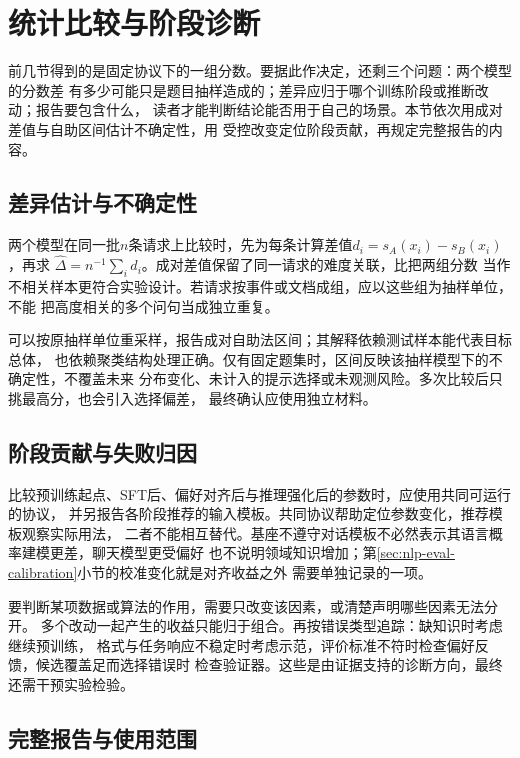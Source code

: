 \section{统计比较与阶段诊断}
\label{sec:nlp-eval-analysis}

前几节得到的是固定协议下的一组分数。要据此作决定，还剩三个问题：两个模型的分数差
有多少可能只是题目抽样造成的；差异应归于哪个训练阶段或推断改动；报告要包含什么，
读者才能判断结论能否用于自己的场景。本节依次用成对差值与自助区间估计不确定性，用
受控改变定位阶段贡献，再规定完整报告的内容。

\subsection{差异估计与不确定性}
\label{sec:nlp-eval-uncertainty}

两个模型在同一批$n$条请求上比较时，先为每条计算差值$d_i=s_A(x_i)-s_B(x_i)$，再求
$\widehat\Delta=n^{-1}\sum_i d_i$。成对差值保留了同一请求的难度关联，比把两组分数
当作不相关样本更符合实验设计。若请求按事件或文档成组，应以这些组为抽样单位，不能
把高度相关的多个问句当成独立重复。

可以按原抽样单位重采样，报告成对自助法区间；其解释依赖测试样本能代表目标总体，
也依赖聚类结构处理正确。仅有固定题集时，区间反映该抽样模型下的不确定性，不覆盖未来
分布变化、未计入的提示选择或未观测风险。多次比较后只挑最高分，也会引入选择偏差，
最终确认应使用独立材料。

\subsection{阶段贡献与失败归因}
\label{sec:nlp-eval-attribution}

比较预训练起点、SFT后、偏好对齐后与推理强化后的参数时，应使用共同可运行的协议，
并另报告各阶段推荐的输入模板。共同协议帮助定位参数变化，推荐模板观察实际用法，
二者不能相互替代。基座不遵守对话模板不必然表示其语言概率建模更差，聊天模型更受偏好
也不说明领域知识增加；第\ref{sec:nlp-eval-calibration}小节的校准变化就是对齐收益之外
需要单独记录的一项。

要判断某项数据或算法的作用，需要只改变该因素，或清楚声明哪些因素无法分开。
多个改动一起产生的收益只能归于组合。再按错误类型追踪：缺知识时考虑继续预训练，
格式与任务响应不稳定时考虑示范，评价标准不符时检查偏好反馈，候选覆盖足而选择错误时
检查验证器。这些是由证据支持的诊断方向，最终还需干预实验检验。

\subsection{完整报告与使用范围}
\label{sec:nlp-eval-report}

